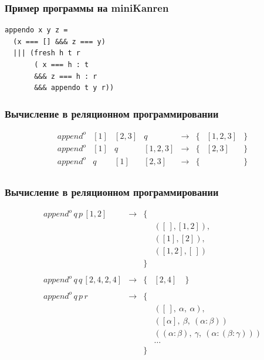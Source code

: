 \documentclass{beamer}
\begin{document}
\begin{frame}[fragile]
  \transwipe[direction=90]
  \frametitle{Пример программы на miniKanren}
\begin{center}
\begin{minipage}{4.5cm}
\begin{lstlisting}[frame=single]  
appendo x y z = 
  (x === [] &&& z === y)
  ||| (fresh h t r
       ( x === h : t 
       &&& z === h : r 
       &&& appendo t y r))
\end{lstlisting}
\end{minipage}
\end{center}
\end{frame}


\begin{frame}[fragile]
  \transwipe[direction=90]
  \frametitle{Вычисление в реляционном программировании}
  
$$ 
\begin{array}{lccccccl}
append^o & [1] & [2, 3] & q         &\rightarrow& \{ &  [1, 2, 3] & \} \\
append^o & [1] & q      & [1, 2, 3] &\rightarrow& \{ & [2, 3] & \} \\
append^o & q   & [1]    & [2, 3]    &\rightarrow& \{ & & \}  \\
\end{array}
$$

\end{frame}

\begin{frame}[fragile]
  \transwipe[direction=90]
  \frametitle{Вычисление в реляционном программировании}

$$ 
\begin{array}{rccl}
append^o \, q \, p \, [1, 2] &\rightarrow& \{ &                \\
                    &           &    & ([\,], [1,2]), \\
                    &           &    & ([1], [2]), \\
                    &           &    & ([1,2], [\,]) \\
                    &           & \} \\
                    &           & \\ 
append^o \, q \, q \, [2, 4, 2, 4] &\rightarrow& \{ &  [2, 4] \quad \} \\
                    &           & \\ 
append^o \, q \, p \, r      &\rightarrow& \{ &  \\
                    &           &    &([\,], \ \alpha, \ \alpha), \\
                    &           &    & ([\alpha], \  \beta, \ (\alpha:\beta)) \\
                    &           &    & ((\alpha : \beta),\  \gamma, \ (\alpha:(\beta:\gamma))) \\
                    &           &    & \dots \\
                    &           &    \}  \\
\end{array}
$$

\end{frame}
\end{document}
